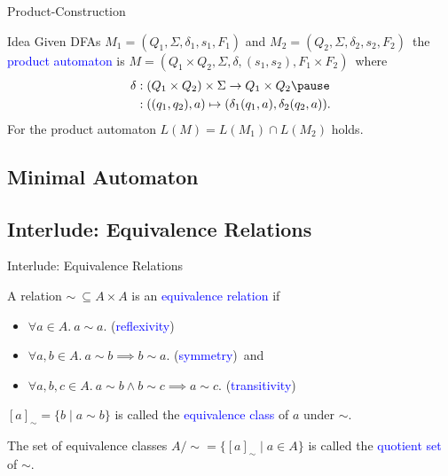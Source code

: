 \documentclass{beamer}
\def\padding{\vspace{0.5cm}}
\def\b{\textcolor{blue}}
\begin{document}
\begin{frame}{Product-Construction}
    \begin{block}{Idea}
        Given DFAs $M_1 = (Q_1, \Sigma, \delta_1, s_1, F_1)$ and $M_2 = (Q_2, \Sigma, \delta_2, s_2, F_2)$\pause\ the \b{product automaton} is $M = (Q_1 \times Q_2, \Sigma, \delta, (s_1, s_2), F_1 \times F_2)$\pause\ where
        \begin{align*}
            \delta &: (Q_1 \times Q_2) \times \Sigma \to Q_1 \times Q_2 \pause\\
                   &: ((q_1, q_2), a) \mapsto (\delta_1(q_1, a), \delta_2(q_2, a)).
        \end{align*}\pause\padding
        For the product automaton $L(M) = L(M_1) \cap L(M_2)$ holds.
    \end{block}
\end{frame}

\subsection{Minimal Automaton}

\subsection{Interlude: Equivalence Relations}

\begin{frame}{Interlude: Equivalence Relations}
    \begin{definition}
        A relation $\sim\ \subseteq A \times A$ is an \b{equivalence relation} if\pause
        \begin{itemize}
            \item $\forall a \in A.\ a \sim a.$ (\b{reflexivity})\pause
            \item $\forall a, b \in A.\ a \sim b \implies b \sim a.$ (\b{symmetry})\pause\ and
            \item $\forall a, b, c \in A.\ a \sim b \land b \sim c \implies a \sim c.$ (\b{transitivity})
        \end{itemize}\pause\par\padding
        $[a]_\sim = \{b \mid a \sim b\}$ is called the \b{equivalence class} of $a$ under $\sim$.\pause\par\padding
        The set of equivalence classes $A/{\sim} = \{[a]_\sim \mid a \in A\}$ is called the \b{quotient set} of $\sim$.
    \end{definition}
\end{frame}
\end{document}
